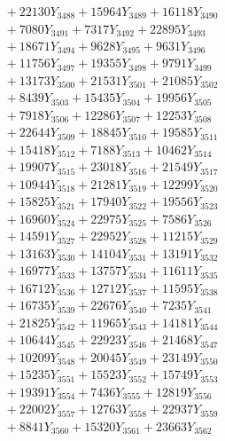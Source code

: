 \documentclass[a4paper,10pt]{article}
\begin{document}
{\begin{align}
&\;  + 22130 Y_{3488} + 15964 Y_{3489} + 16118 Y_{3490} \\[0.3ex]
&\;  + 7080 Y_{3491} + 7317 Y_{3492} + 22895 Y_{3493} \\[0.3ex]
&\;  + 18671 Y_{3494} + 9628 Y_{3495} + 9631 Y_{3496} \\[0.3ex]
&\;  + 11756 Y_{3497} + 19355 Y_{3498} + 9791 Y_{3499} \\[0.3ex]
&\;  + 13173 Y_{3500} + 21531 Y_{3501} + 21085 Y_{3502} \\[0.3ex]
&\;  + 8439 Y_{3503} + 15435 Y_{3504} + 19956 Y_{3505} \\[0.3ex]
&\;  + 7918 Y_{3506} + 12286 Y_{3507} + 12253 Y_{3508} \\[0.5ex]\allowbreak
&\;  + 22644 Y_{3509} + 18845 Y_{3510} + 19585 Y_{3511} \\[0.3ex]
&\;  + 15418 Y_{3512} + 7188 Y_{3513} + 10462 Y_{3514} \\[0.3ex]
&\;  + 19907 Y_{3515} + 23018 Y_{3516} + 21549 Y_{3517} \\[0.3ex]
&\;  + 10944 Y_{3518} + 21281 Y_{3519} + 12299 Y_{3520} \\[0.3ex]
&\;  + 15825 Y_{3521} + 17940 Y_{3522} + 19556 Y_{3523} \\[0.3ex]
&\;  + 16960 Y_{3524} + 22975 Y_{3525} + 7586 Y_{3526} \\[0.3ex]
&\;  + 14591 Y_{3527} + 22952 Y_{3528} + 11215 Y_{3529} \\[0.3ex]
&\;  + 13163 Y_{3530} + 14104 Y_{3531} + 13191 Y_{3532} \\[0.3ex]
&\;  + 16977 Y_{3533} + 13757 Y_{3534} + 11611 Y_{3535} \\[0.3ex]
&\;  + 16712 Y_{3536} + 12712 Y_{3537} + 11595 Y_{3538} \\[0.5ex]\allowbreak
&\;  + 16735 Y_{3539} + 22676 Y_{3540} + 7235 Y_{3541} \\[0.3ex]
&\;  + 21825 Y_{3542} + 11965 Y_{3543} + 14181 Y_{3544} \\[0.3ex]
&\;  + 10644 Y_{3545} + 22923 Y_{3546} + 21468 Y_{3547} \\[0.3ex]
&\;  + 10209 Y_{3548} + 20045 Y_{3549} + 23149 Y_{3550} \\[0.3ex]
&\;  + 15235 Y_{3551} + 15523 Y_{3552} + 15749 Y_{3553} \\[0.3ex]
&\;  + 19391 Y_{3554} + 7436 Y_{3555} + 12819 Y_{3556} \\[0.3ex]
&\;  + 22002 Y_{3557} + 12763 Y_{3558} + 22937 Y_{3559} \\[0.3ex]
&\;  + 8841 Y_{3560} + 15320 Y_{3561} + 23663 Y_{3562} \\[0.3ex]

\end{align}}
\end{document}
